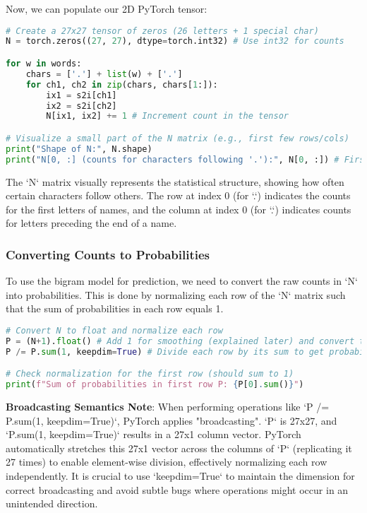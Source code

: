 Now, we can populate our 2D PyTorch tensor:

\begin{lstlisting}[language=Python, caption=Populating the Count Matrix N]
# Create a 27x27 tensor of zeros (26 letters + 1 special char)
N = torch.zeros((27, 27), dtype=torch.int32) # Use int32 for counts

for w in words:
    chars = ['.'] + list(w) + ['.']
    for ch1, ch2 in zip(chars, chars[1:]):
        ix1 = s2i[ch1]
        ix2 = s2i[ch2]
        N[ix1, ix2] += 1 # Increment count in the tensor

# Visualize a small part of the N matrix (e.g., first few rows/cols)
print("Shape of N:", N.shape)
print("N[0, :] (counts for characters following '.'):", N[0, :]) # First row shows start probabilities
\end{lstlisting}

The `N` matrix visually represents the statistical structure, showing how often certain characters follow others. The row at index 0 (for `.`) indicates the counts for the first letters of names, and the column at index 0 (for `.`) indicates counts for letters preceding the end of a name.

\subsubsection{Converting Counts to Probabilities}
To use the bigram model for prediction, we need to convert the raw counts in `N` into probabilities. This is done by normalizing each row of the `N` matrix such that the sum of probabilities in each row equals 1.

\begin{lstlisting}[language=Python, caption=Converting Counts to Probabilities (P)]
# Convert N to float and normalize each row
P = (N+1).float() # Add 1 for smoothing (explained later) and convert to float
P /= P.sum(1, keepdim=True) # Divide each row by its sum to get probabilities

# Check normalization for the first row (should sum to 1)
print(f"Sum of probabilities in first row P: {P[0].sum()}")
\end{lstlisting}

\textbf{Broadcasting Semantics Note}: When performing operations like `P /= P.sum(1, keepdim=True)`, PyTorch applies "broadcasting". `P` is 27x27, and `P.sum(1, keepdim=True)` results in a 27x1 column vector. PyTorch automatically stretches this 27x1 vector across the columns of `P` (replicating it 27 times) to enable element-wise division, effectively normalizing each row independently. It is crucial to use `keepdim=True` to maintain the dimension for correct broadcasting and avoid subtle bugs where operations might occur in an unintended direction.

